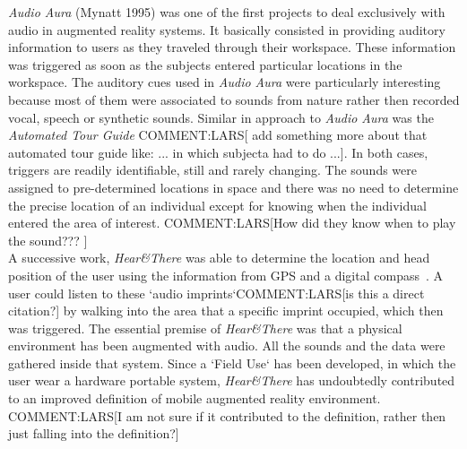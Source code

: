\documentclass[journal]{IEEEtran}
\begin{document}
\emph{Audio Aura} (Mynatt 1995) was one of the first projects to deal exclusively with audio in augmented reality systems. It basically consisted in providing auditory information to users as they traveled through their workspace. These information was triggered as soon as the subjects entered particular locations in the workspace. The auditory cues used in \emph{Audio Aura} were particularly interesting because most of them were associated to sounds from nature rather then recorded vocal, speech or synthetic sounds. Similar in approach to \emph{Audio Aura} was the \emph{Automated Tour Guide} \cite{Bederson1995} COMMENT:LARS[ add something more about that automated tour guide like: ... in which subjecta had to do ...]. In both cases, triggers are readily identifiable, still and rarely changing. The sounds were assigned to pre-determined locations in space and there was no need to determine the precise location of an individual except for knowing when the individual entered the area of interest. COMMENT:LARS[How did they know when to play the sound??? ]\\

A successive work, \emph{Hear\&There} was able to determine the location and head position of the user using the information from GPS and a digital compass~\cite{}. A user could listen to these `audio imprints`COMMENT:LARS[is this a direct citation?] by walking into the area that a specific imprint occupied, which then was triggered. The essential premise of  \emph{Hear\&There} was that a physical environment has been augmented with audio. All the sounds and the data were gathered inside that system. Since a `Field Use` has been developed, in which the user wear a hardware portable system, \emph{Hear\&There} has undoubtedly contributed to an improved definition of mobile augmented reality environment. COMMENT:LARS[I am not sure if it contributed to the definition, rather then just falling into the definition?]\\
\end{document}
